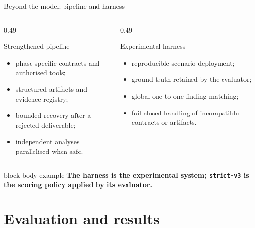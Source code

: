 \documentclass[aspectratio=169,10pt]{beamer}
\newcommand{\keymessage}[1]{%
  \begin{beamercolorbox}[rounded=true,sep=1.1ex,wd=\linewidth]{block body example}
    \centering\bfseries #1
  \end{beamercolorbox}
}
\begin{document}
\begin{frame}{Beyond the model: pipeline and harness}
  \begin{columns}[T,onlytextwidth]
    \begin{column}{0.49\textwidth}
      \begin{block}{Strengthened pipeline}
        \begin{itemize}
          \item phase-specific contracts and authorised tools;
          \item structured artifacts and evidence registry;
          \item bounded recovery after a rejected deliverable;
          \item independent analyses parallelised when safe.
        \end{itemize}
      \end{block}
    \end{column}
    \begin{column}{0.49\textwidth}
      \begin{exampleblock}{Experimental harness}
        \begin{itemize}
          \item reproducible scenario deployment;
          \item ground truth retained by the evaluator;
          \item global one-to-one finding matching;
          \item fail-closed handling of incompatible contracts or artifacts.
        \end{itemize}
      \end{exampleblock}
    \end{column}
  \end{columns}

  \vspace{0.7em}
  \keymessage{The harness is the experimental system; \texttt{strict-v3} is the scoring policy applied by its evaluator.}
\end{frame}

\section{Evaluation and results}
\end{document}
